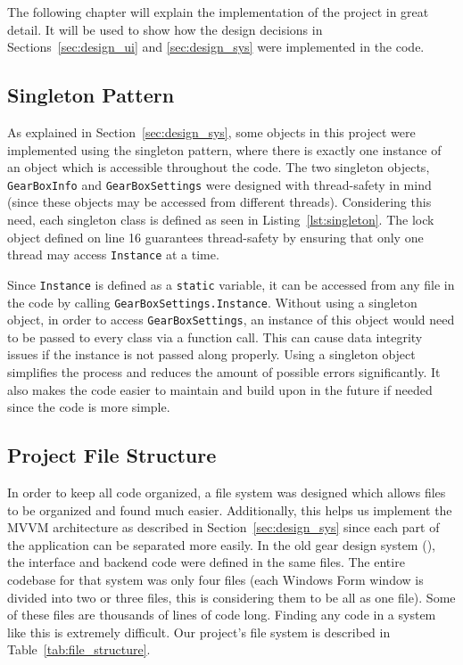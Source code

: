 \begin{doublespace}

The following chapter will explain the implementation of the project in great detail. It will be used to show how the design decisions in Sections~\ref{sec:design_ui} and \ref{sec:design_sys} were implemented in the code.

\subsection{Singleton Pattern}

As explained in Section~\ref{sec:design_sys}, some objects in this project were implemented using the singleton pattern, where there is exactly one instance of an object which is accessible throughout the code. The two singleton objects, \texttt{GearBoxInfo} and \texttt{GearBoxSettings} were designed with thread-safety in mind (since these objects may be accessed from different threads). Considering this need, each singleton class is defined as seen in Listing~\ref{lst:singleton}. The lock object defined on line 16 guarantees thread-safety by ensuring that only one thread may access \texttt{Instance} at a time.


Since \texttt{Instance} is defined as a \texttt{static} variable, it can be accessed from any file in the code by calling \texttt{GearBoxSettings.Instance}. Without using a singleton object, in order to access \texttt{GearBoxSettings}, an instance of this object would need to be passed to every class via a function call. This can cause data integrity issues if the instance is not passed along properly. Using a singleton object simplifies the process and reduces the amount of possible errors significantly. It also makes the code easier to maintain and build upon in the future if needed since the code is more simple.

\subsection{Project File Structure}

In order to keep all code organized, a file system was designed which allows files to be organized and found much easier. Additionally, this helps us implement the MVVM architecture as described in Section~\ref{sec:design_sys} since each part of the application can be separated more easily. In the old gear design system (\cite{holman_automated_2018}), the interface and backend code were defined in the same files. The entire codebase for that system was only four files (each Windows Form window is divided into two or three files, this is considering them to be all as one file). Some of these files are thousands of lines of code long. Finding any code in a system like this is extremely difficult. Our project's file system is described in Table~\ref{tab:file_structure}.


\end{doublespace}
